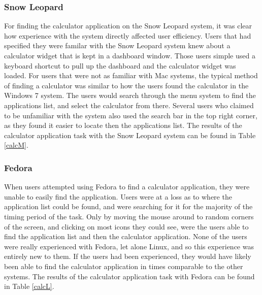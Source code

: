 \documentclass[11pt,letterpaper]{report}
\begin{document}
\subsubsection{Snow Leopard}
For finding the calculator application on the Snow Leopard system, it was clear how experience with the system directly affected user efficiency. Users that had specified they were familar with the Snow Leopard system knew about a calculator widget that is kept in a dashboard window. Those users simple used a keyboard shortcut to pull up the dashboard and the calculator widget was loaded. For users that were not as familiar with Mac systems, the typical method of finding a calculator was similar to how the users found the calculator in the Windows 7 system. The users would search through the menu system to find the applications list, and select the calculator from there. Several users who claimed to be unfamiliar with the system also used the search bar in the top right corner, as they found it easier to locate then the applications list. The results of the calculator application task with the Snow Leopard system can be found in Table \ref{calcM}.

\subsubsection{Fedora}
When users attempted using Fedora to find a calculator application, they were unable to easily find the application. Users were at a loss as to where the application list could be found, and were searching for it for the majority of the timing period of the task. Only by moving the mouse around to random corners of the screen, and clicking on most icons they could see, were the users able to find the application list and then the calculator application. None of the users were really experienced with Fedora, let alone Linux, and so this experience was entirely new to them. If the users had been experienced, they would have likely been able to find the calculator application in times comparable to the other systems. The results of the calculator application task with Fedora can be found in Table \ref{calcL}.
\end{document}
